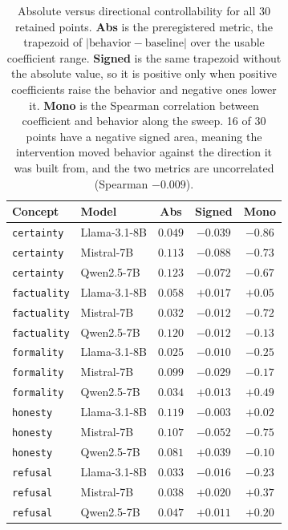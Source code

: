\documentclass{article}
\begin{document}
\begin{table}[htbp]
  \caption{Absolute versus directional controllability for all 30 retained
  points.
  \textbf{Abs} is the preregistered metric, the trapezoid of
  $|\text{behavior} - \text{baseline}|$ over the usable coefficient range.
  \textbf{Signed} is the same trapezoid without the absolute value, so it is
  positive only when positive coefficients raise the behavior and negative ones
  lower it. \textbf{Mono} is the Spearman correlation between coefficient and
  behavior along the sweep. 16 of 30 points have a negative signed area, meaning
  the intervention moved behavior against the direction it was built from, and the
  two metrics are uncorrelated (Spearman $-0.009$).}
  \label{tab:directional}
  \centering
  \footnotesize
  \begin{tabular}{llccc}
    \toprule
    Concept & Model & Abs & Signed & Mono \\
    \midrule
    \texttt{certainty} & Llama-3.1-8B & $0.049$ & $-0.039$ & $-0.86$ \\
    \texttt{certainty} & Mistral-7B & $0.113$ & $-0.088$ & $-0.73$ \\
    \texttt{certainty} & Qwen2.5-7B & $0.123$ & $-0.072$ & $-0.67$ \\
    \texttt{factuality} & Llama-3.1-8B & $0.058$ & $+0.017$ & $+0.05$ \\
    \texttt{factuality} & Mistral-7B & $0.032$ & $-0.012$ & $-0.72$ \\
    \texttt{factuality} & Qwen2.5-7B & $0.120$ & $-0.012$ & $-0.13$ \\
    \texttt{formality} & Llama-3.1-8B & $0.025$ & $-0.010$ & $-0.25$ \\
    \texttt{formality} & Mistral-7B & $0.099$ & $-0.029$ & $-0.17$ \\
    \texttt{formality} & Qwen2.5-7B & $0.034$ & $+0.013$ & $+0.49$ \\
    \texttt{honesty} & Llama-3.1-8B & $0.119$ & $-0.003$ & $+0.02$ \\
    \texttt{honesty} & Mistral-7B & $0.107$ & $-0.052$ & $-0.75$ \\
    \texttt{honesty} & Qwen2.5-7B & $0.081$ & $+0.039$ & $-0.10$ \\
    \texttt{refusal} & Llama-3.1-8B & $0.033$ & $-0.016$ & $-0.23$ \\
    \texttt{refusal} & Mistral-7B & $0.038$ & $+0.020$ & $+0.37$ \\
    \texttt{refusal} & Qwen2.5-7B & $0.047$ & $+0.011$ & $+0.20$ \\

\end{tabular}
\end{table}
\end{document}
